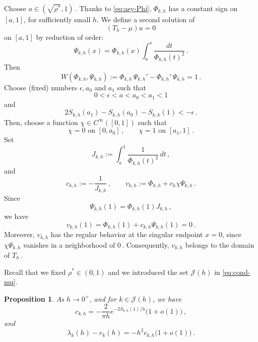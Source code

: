 \documentclass[11pt]{amsart}
\numberwithin{equation}{section}
\newtheorem{proposition}[theorem]{Proposition}
\theoremstyle{remark}
\newcommand{\mn}{\medskip\noindent}
\begin{document}
Choose $a\in(\sqrt{\rho^*},1)\,$. Thanks to \eqref{eq:asy-Phi}, 
$\Phi_{k,h}$ has a constant sign on $[a,1]$, for sufficiently small $h$. 
We define a second solution of
\[
(T_h-\mu)u=0
\]
on $[a,1]$ by reduction of order:
\begin{equation}\label{eq:def-Psi}
	\Psi_{k,h}(x)
	=
	\Phi_{k,h}(x)\int_a^x\frac{dt}{\Phi_{k,h}(t)^2}\,.
\end{equation}
Then
\begin{equation}\label{eq:Wronskian-normalization}
	W(\Phi_{k,h},\Psi_{k,h})
	:=
	\Phi_{k,h}\,\Psi_{k,h}'-\Phi_{k,h}'\,\Psi_{k,h}
	=
	1\,.
\end{equation}
Choose (fixed) numbers $\epsilon,a_0$ and $a_1$ such that
\[
0<\epsilon<a<a_0<a_1<1
\]
and
\begin{equation}\label{eq:cond-a-i}
2S_{k,h}(a_1)-S_{k,h}(a_0)-S_{k,h}(1)<-\epsilon\,.
\end{equation}
Then, choose a function $\chi\in C^\infty([0,1])$ such that
\[
\chi=0 \text{ on }[0,a_0]\,,
\qquad
\chi=1 \text{ on }[a_1,1]\,.
\]
Set
\begin{equation}\label{eq:J-def}
	J_{k,h}
	:=
	\int_a^1\frac{1}{\Phi_{k,h}(t)^2}\,dt\,,
\end{equation}
and
\begin{equation}\label{eq:quasimode-def}
	c_{k,h}:=-\frac{1}{J_{k,h}}\,,
	\qquad
	v_{k,h}:=\Phi_{k,h}+c_h\chi\Psi_{k,h}\,.
\end{equation}
Since
\[
\Psi_{k,h}(1)=\Phi_{k,h}(1)J_{k,h}\,,
\]
we have
\[
v_{k,h}(1)=\Phi_{k,h}(1)+c_{k,h}\Psi_{k,h}(1)=0\,.
\]
Moreover, $v_{k,h}$ has the regular behavior at the singular endpoint
$x=0$, since $\chi\Psi_{k,h}$ vanishes in a neighborhood of $0$\,.
Consequently, $v_{k,h}$ belongs to the domain of  $T_h\,$.

\mn 

Recall that we fixed $\rho^*\in(0,1)$ and we introduced the set $\mathcal J(h)$ in \eqref{eq:cond-mu}.
%
\begin{proposition}\label{prop:boundary-quasimode}
	As $h\to0^+$, and for $k\in\mathcal J(h)$, we have
	\begin{equation}\label{eq:asy-ch*}
c_{k,h}=-\frac{2}{\pi h}e^{-2S_{k,h}(1)/h}\bigl(1+o(1)\bigr)\,,
\end{equation}
%
and
\begin{equation}\label{eq:eigenvalue-shift-J}
		\lambda_k(h)-e_k(h)
		=-h^2c_{k,h}\bigl(1+o(1)\bigr)\,.
	\end{equation}
\end{proposition}
\end{document}
